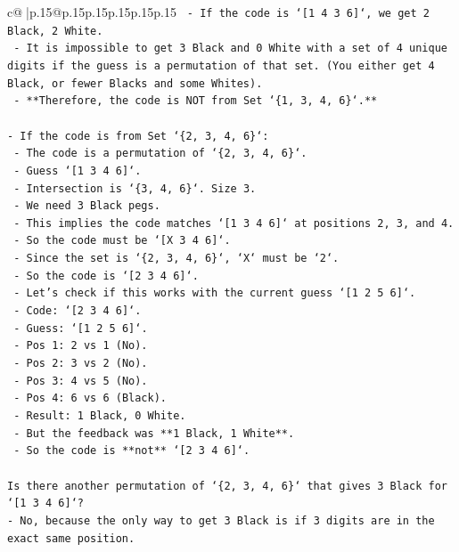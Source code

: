 \documentclass{article}
\begin{document}
{\begin{supertabular}{c@{$\;$}|p{.15\linewidth}@{}p{.15\linewidth}p{.15\linewidth}p{.15\linewidth}p{.15\linewidth}p{.15\linewidth}}
{{{\texttt{    {-}   If the code is `{[}1 4 3 6{]}`, we get 2 Black, 2 White.} \\
\texttt{    {-}   It is impossible to get 3 Black and 0 White with a set of 4 unique digits if the guess is a permutation of that set. (You either get 4 Black, or fewer Blacks and some Whites).} \\
\texttt{    {-}   **Therefore, the code is NOT from Set `\{1, 3, 4, 6\}`.**} \\
\\ 
\texttt{{-}   If the code is from Set `\{2, 3, 4, 6\}`:} \\
\texttt{    {-}   The code is a permutation of `\{2, 3, 4, 6\}`.} \\
\texttt{    {-}   Guess `{[}1 3 4 6{]}`.} \\
\texttt{    {-}   Intersection is `\{3, 4, 6\}`. Size 3.} \\
\texttt{    {-}   We need 3 Black pegs.} \\
\texttt{    {-}   This implies the code matches `{[}1 3 4 6{]}` at positions 2, 3, and 4.} \\
\texttt{    {-}   So the code must be `{[}X 3 4 6{]}`.} \\
\texttt{    {-}   Since the set is `\{2, 3, 4, 6\}`, `X` must be `2`.} \\
\texttt{    {-}   So the code is `{[}2 3 4 6{]}`.} \\
\texttt{    {-}   Let's check if this works with the current guess `{[}1 2 5 6{]}`.} \\
\texttt{        {-}   Code: `{[}2 3 4 6{]}`.} \\
\texttt{        {-}   Guess: `{[}1 2 5 6{]}`.} \\
\texttt{        {-}   Pos 1: 2 vs 1 (No).} \\
\texttt{        {-}   Pos 2: 3 vs 2 (No).} \\
\texttt{        {-}   Pos 3: 4 vs 5 (No).} \\
\texttt{        {-}   Pos 4: 6 vs 6 (Black).} \\
\texttt{        {-}   Result: 1 Black, 0 White.} \\
\texttt{        {-}   But the feedback was **1 Black, 1 White**.} \\
\texttt{        {-}   So the code is **not** `{[}2 3 4 6{]}`.} \\
\\ 
\texttt{Is there another permutation of `\{2, 3, 4, 6\}` that gives 3 Black for `{[}1 3 4 6{]}`?} \\
\texttt{{-}   No, because the only way to get 3 Black is if 3 digits are in the exact same position.} \\
}}}
\end{supertabular}}
\end{document}
